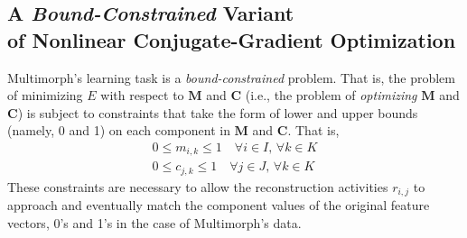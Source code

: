 %

\subsection{A \textit{Bound-Constrained} Variant \\ of Nonlinear Conjugate-Gradient Optimization}
\label{sec:active-set}
Multimorph's learning task is a \emph{bound-constrained} problem. That is,
the problem of minimizing $E$ with respect to $\mathbf{M}$ and $\mathbf{C}$ 
(i.e., the problem of \emph{optimizing}  $\mathbf{M}$ and $\mathbf{C}$) is 
subject to constraints that take the form of 
lower and upper bounds (namely, 0 and 1) on each component in 
$\mathbf{M}$ and $\mathbf{C}$. That is,
\begin{align}
\label{eq:bounds-m}
0 \le m_{i,k} \le 1 \quad \text{$\forall i \in I$, $\forall k \in K$} \\
\label{eq:bounds-c}
0 \le c_{j,k} \le 1 \quad \text{$\forall j \in J$, $\forall k  \in K$}
\end{align}
These constraints are necessary to allow the reconstruction activities $r_{i,j}$ to approach 
and eventually match the component values of the original feature vectors, 0's and 1's in the case of Multimorph's data.

